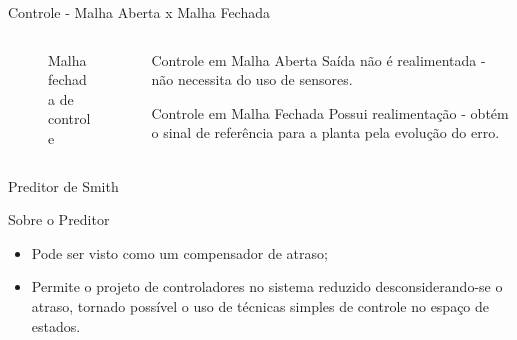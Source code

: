 \documentclass[10pt]{beamer}
\begin{document}
\begin{frame}[fragile]{Controle - Malha Aberta x Malha Fechada}
\begin{columns}[T,onlytextwidth]
\begin{column}{.5\textwidth}
\begin{figure}[!ht]
\caption{Malha fechada de controle\label{mfechadatikz}}
\end{figure}
\end{column}

\begin{column}{.5\textwidth}

\begin{block}{Controle em Malha Aberta}
Saída não é realimentada - não necessita do uso de sensores.
\newline
\newline
\newline
\end{block}

\begin{block}{Controle em Malha Fechada}
Possui realimentação - obtém o sinal de referência para a planta pela evolução do erro.\end{block}

\end{column}

\end{columns}
\end{frame}


\begin{frame}[fragile]{Preditor de Smith}
\begin{block}{Sobre o Preditor}
\begin{itemize}
\item Pode ser visto como um compensador de atraso;
\item Permite o projeto de controladores no sistema reduzido desconsiderando-se o atraso, tornado possível o uso de técnicas simples de controle no espaço de estados.
\end{itemize}
\end{block}
\end{frame}
\end{document}
